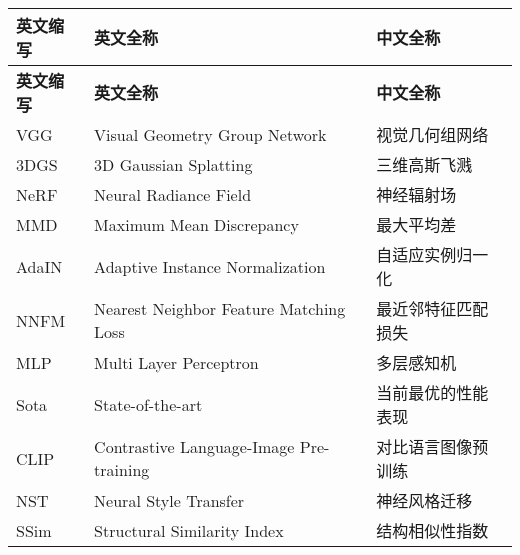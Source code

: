 \cleardoublepage
{}
\begin{center}
    \begin{longtable}{m{2cm}m{8cm}m{5cm}}
        \toprule
        \textbf{英文缩写}&\textbf{英文全称}&\textbf{中文全称}\\
        \midrule
        \endfirsthead
        \toprule
        \textbf{英文缩写}&\textbf{英文全称}&\textbf{中文全称}\\
        \midrule
        \endhead 
        \bottomrule
        \endfoot
        \bottomrule
        \endlastfoot
        VGG&Visual Geometry Group Network&视觉几何组网络\\
        3DGS&3D Gaussian Splatting&三维高斯飞溅\\
        NeRF&Neural Radiance Field&神经辐射场\\
        MMD&Maximum Mean Discrepancy&最大平均差\\
        AdaIN&Adaptive Instance Normalization&自适应实例归一化\\
        NNFM&Nearest Neighbor Feature Matching Loss&最近邻特征匹配损失\\
        MLP&Multi Layer Perceptron&多层感知机\\
        Sota&State-of-the-art&当前最优的性能表现\\
        CLIP&Contrastive Language-Image Pre-training&对比语言图像预训练\\
        NST&Neural Style Transfer&神经风格迁移\\
        SSim&Structural Similarity Index&结构相似性指数\\
	\end{longtable}
\end{center}
